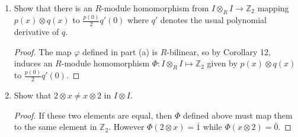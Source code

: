 \documentclass{article}
\begin{document}
\begin{enumerate}[label={(\alph*)}]
    \item Show that there is an $R$-module homomorphism from $I\otimes_R
      I\rightarrow\mathbb{Z}_2$ mapping $p(x)\otimes q(x)$ to
      $\frac{p(0)}{2}q'(0)$ where $q'$ denotes the usual polynomial
      derivative of $q$.

      \begin{proof}
        The map $\varphi$ defined in part (a) is $R$-bilinear, so by
        Corollary 12, induces an $R$-module homomorphism $\Phi:I\otimes_R
        I\mapsto\mathbb{Z}_2$ given by $p(x)\otimes q(x)$ to
        $\frac{p(0)}{2}q'(0)$.
      \end{proof}

    \item Show that $2\otimes x \neq x\otimes2$ in $I\otimes I$.
      \begin{proof}
        If these two elements are equal, then $\Phi$ defined above must map
        them to the same element in $\mathbb{Z}_2$. However $\Phi(2\otimes
        x) =\bar{1}$ while $\Phi(x\otimes2) =\bar{0}$.
      \end{proof}
  \end{enumerate}
\end{document}
